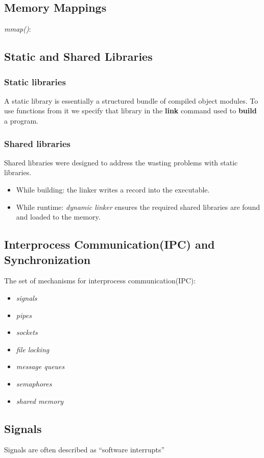 \documentclass{article}
\numberwithin{equation}{section}
\numberwithin{figure}{section}
\begin{document}
\subsection{Memory Mappings}
\textit{mmap()}:




\subsection{Static and Shared Libraries}
\subsubsection*{Static libraries}
A static library is essentially a structured bundle of compiled object modules. To use functions from it we specify that library in the \textbf{link} command used to \textbf{build} a program.
\subsubsection*{Shared libraries}
Shared libraries were designed to address the wasting problems with static libraries.
\begin{itemize}
\item While building: the linker writes a record into the executable.
\item While runtime: \textit{dynamic linker} ensures the required shared libraries are found and loaded to the memory.
\end{itemize}

\subsection{Interprocess Communication(IPC) and Synchronization}
The set of mechanisms for interprocess communication(IPC):
\begin{itemize}
\item \textit{signals}
\item \textit{pipes}
\item \textit{sockets}
\item \textit{file locking}
\item \textit{message queues}
\item \textit{semaphores}
\item \textit{shared memory}
\end{itemize}

\subsection{Signals}
Signals are often described as ``software interrupts''
\end{document}

